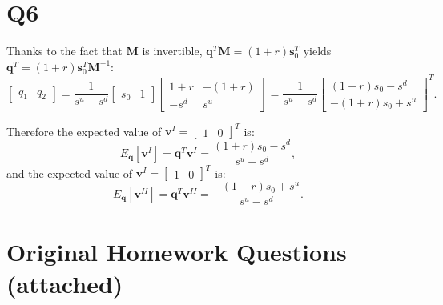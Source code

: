 \documentclass[final,3p,times]{elsarticle}
\begin{document}
\section{Q6}
	Thanks to the fact that $\mathbf{M}$ is invertible, $\mathbf{q}^T \mathbf{M}=\left(1+r\right)\mathbf{s}_0^T$ yields $\mathbf{q}^T=\left(1+r\right)\mathbf{s}_0^T \mathbf{M}^{-1}$:
	\begin{equation}
		\begin{bmatrix} q_1 & q_2 \end{bmatrix}
		=
		\frac{1}{s^u-s^d}
		\begin{bmatrix} s_0 & 1 \end{bmatrix}
		\begin{bmatrix} 1+r & -\left(1+r\right) \\ -s^d & s^u \end{bmatrix}
		=
		\frac{1}{s^u-s^d}
		\begin{bmatrix} \left(1+r\right)s_0 - s^d \\ -\left(1+r\right)s_0 + s^u \end{bmatrix}^T
		.
	\end{equation}
	
	Therefore the expected value of $\mathbf{v}^{I}=\begin{bmatrix} 1 & 0\end{bmatrix}^T$ is:
	\begin{equation}
		E_{\mathbf{q}}\left[\mathbf{v}^{I}\right]=\mathbf{q}^T \mathbf{v}^{I}
		=\frac{\left(1+r\right)s_0 - s^d}{s^u-s^d}
		,
	\end{equation}
	and the expected value of $\mathbf{v}^{I}=\begin{bmatrix} 1 & 0\end{bmatrix}^T$ is:
	\begin{equation}
		E_{\mathbf{q}}\left[\mathbf{v}^{II}\right]=\mathbf{q}^T \mathbf{v}^{II}
		=\frac{-\left(1+r\right)s_0 + s^u}{s^u-s^d}
		.
	\end{equation}
	
\appendix

\section{Original Homework Questions (attached)}
	
\end{document}
